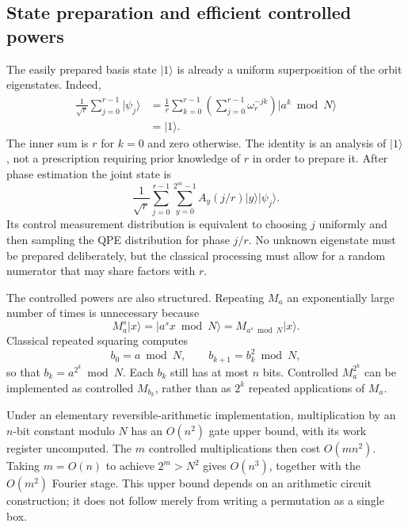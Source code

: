 \documentclass[11pt,oneside,openany]{book}
\providecommand{\ket}{}
\renewcommand{\ket}[1]{\lvert #1\rangle}
\theoremstyle{definition}
\begin{document}
\subsection{State preparation and efficient controlled powers}

The easily prepared basis state $\ket1$ is already a uniform superposition of the orbit eigenstates. Indeed,
\begin{align}
 \frac1{\sqrt r}\sum_{j=0}^{r-1}\ket{\psi_j}
 &=\frac1r\sum_{k=0}^{r-1}\left(\sum_{j=0}^{r-1}\omega_r^{-jk}\right)\ket{a^k\bmod N}\\
 &=\ket1.
 \label{eq:phase:oneeigenexpansion}
\end{align}
The inner sum is $r$ for $k=0$ and zero otherwise. The identity is an analysis of $\ket1$, not a prescription requiring prior knowledge of $r$ in order to prepare it. After phase estimation the joint state is
\begin{equation}
 \frac1{\sqrt r}\sum_{j=0}^{r-1}\sum_{y=0}^{2^m-1}A_y(j/r)\ket y\ket{\psi_j}.
 \label{eq:phase:orderfinalsuperposition}
\end{equation}
Its control measurement distribution is equivalent to choosing $j$ uniformly and then sampling the QPE distribution for phase $j/r$. No unknown eigenstate must be prepared deliberately, but the classical processing must allow for a random numerator that may share factors with $r$.

The controlled powers are also structured. Repeating $M_a$ an exponentially large number of times is unnecessary because
\begin{equation}
 M_a^s\ket x=\ket{a^s x\bmod N}=M_{a^s\bmod N}\ket x.
 \label{eq:phase:modularpowers}
\end{equation}
Classical repeated squaring computes
\begin{equation}
 b_0=a\bmod N,\qquad b_{k+1}=b_k^2\bmod N,
\end{equation}
so that $b_k=a^{2^k}\bmod N$. Each $b_k$ still has at most $n$ bits. Controlled $M_a^{2^k}$ can be implemented as controlled $M_{b_k}$, rather than as $2^k$ repeated applications of $M_a$.

Under an elementary reversible-arithmetic implementation, multiplication by an $n$-bit constant modulo $N$ has an $O(n^2)$ gate upper bound, with its work register uncomputed. The $m$ controlled multiplications then cost $O(mn^2)$. Taking $m=O(n)$ to achieve $2^m>N^2$ gives $O(n^3)$, together with the $O(m^2)$ Fourier stage. This upper bound depends on an arithmetic circuit construction; it does not follow merely from writing a permutation as a single box.
\end{document}

